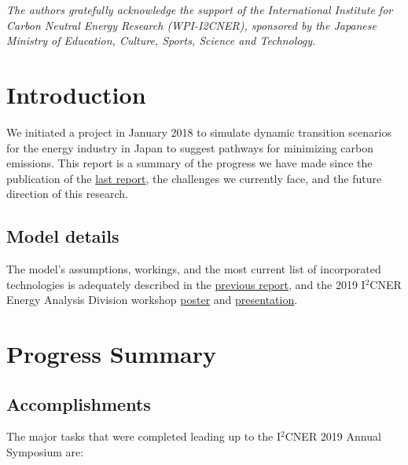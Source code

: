 \documentclass[14pt,a4paper]{article} %
\begin{document}
\begin{titlepage}

    \textit{The authors gratefully acknowledge the support of the International Institute for Carbon
Neutral Energy Research (WPI-I2CNER), sponsored by the Japanese Ministry of Education, Culture, Sports, Science and Technology.}  

\end{titlepage}

\section{Introduction}
We initiated a project in January 2018 to simulate dynamic transition scenarios for the energy industry in Japan to suggest pathways for minimizing carbon emissions. This report is a summary of the progress we have made since the publication of the \href{https://github.com/arfc/i2cner/tree/master/doc/2018-09-report}{last report}, the challenges we currently face, and the future direction of this research. \\

\subsection{Model details}
The model's assumptions, workings, and the most current list of incorporated technologies is adequately described in the \href{https://github.com/arfc/i2cner/tree/master/doc/2018-09-report}{previous report}, and the 2019 I$^2$CNER Energy Analysis Division workshop \href{https://github.com/arfc/i2cner/tree/master/doc/2019-01-poster}{poster} and \href{https://github.com/arfc/i2cner/tree/master/doc/2019-02-presentation}{presentation}.

\section{Progress Summary}

\subsection{Accomplishments}

The major tasks that were completed leading up to the I$^2$CNER 2019 Annual Symposium are:
\end{document}
